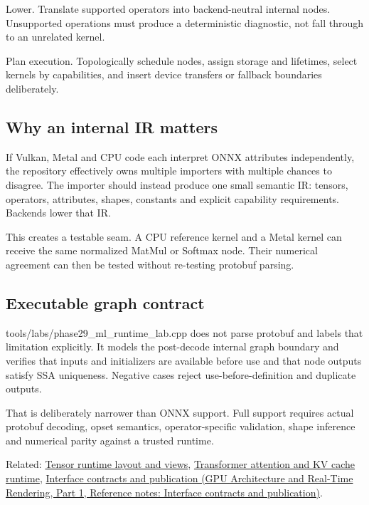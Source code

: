 Lower. Translate supported operators into backend-neutral internal nodes. Unsupported operations must produce a deterministic diagnostic, not fall through to an unrelated kernel.

Plan execution. Topologically schedule nodes, assign storage and lifetimes, select kernels by capabilities, and insert device transfers or fallback boundaries deliberately.

\subsection{Why an internal IR matters}\label{appendix-a87217e3af2b-why-an-internal-ir-matters}

\hypertarget{appendix-a87217e3af2b-why-an-internal-ir-matters}{}

If Vulkan, Metal and CPU code each interpret ONNX attributes independently, the repository effectively owns multiple importers with multiple chances to disagree. The importer should instead produce one small semantic IR: tensors, operators, attributes, shapes, constants and explicit capability requirements. Backends lower that IR.

This creates a testable seam. A CPU reference kernel and a Metal kernel can receive the same normalized MatMul or Softmax node. Their numerical agreement can then be tested without re-testing protobuf parsing.

\subsection{Executable graph contract}\label{appendix-a87217e3af2b-executable-graph-contract}

\hypertarget{appendix-a87217e3af2b-executable-graph-contract}{}

tools/labs/phase29\_ml\_runtime\_lab.cpp does not parse protobuf and labels that limitation explicitly. It models the post-decode internal graph boundary and verifies that inputs and initializers are available before use and that node outputs satisfy SSA uniqueness. Negative cases reject use-before-definition and duplicate outputs.

That is deliberately narrower than ONNX support. Full support requires actual protobuf decoding, opset semantics, operator-specific validation, shape inference and numerical parity against a trusted runtime.

Related: \hyperref[appendix-cebadf3106d1]{Tensor runtime layout and views}, \hyperref[appendix-ea2dadd21ce5]{Transformer attention and KV cache runtime}, \href{../06-GPU-Architecture-and-Real-Time-Rendering-P01/main.pdf\#appendix-fdae7ff0a23f}{Interface contracts and publication (GPU Architecture and Real-Time Rendering, Part 1, Reference notes: Interface contracts and publication)}.

